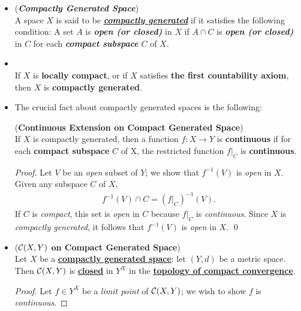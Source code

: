 \documentclass[11pt]{article}
\begin{document}
\begin{itemize}
\item \begin{definition} (\emph{\textbf{Compactly Generated Space}})\\
A space $X$ is said to be \underline{\emph{\textbf{compactly generated}}} if it satisfies the following condition: A set $A$ is \emph{\textbf{open (or closed)}} in $X$ if $A \cap C$ is \emph{\textbf{open (or closed)}} in $C$ for each \textbf{\emph{compact subspace}} $C$ of $X$.
\end{definition}

\item \begin{lemma} \citep{munkres2000topology}\\
If $X$ is \textbf{locally compact}, or if $X$ satisfies \textbf{the first countability axiom}, then $X$ is \textbf{compactly generated}.
\end{lemma}

\item The crucial fact about compactly generated spaces is the following:
\begin{lemma} (\textbf{Continuous Extension on Compact Generated Space})  \citep{munkres2000topology}\\
If $X$ is compactly generated, then a function $f : X \rightarrow Y$ is \textbf{continuous} if for each \textbf{compact subspace} $C$ of X, the restricted function $f |_{C}$ is \textbf{continuous}.
\end{lemma}
\begin{proof}
Let $V$ be an \emph{open} subset of $Y$; we show that $f^{-1}(V)$ is \emph{open} in $X$. Given any subspace $C$ of $X$,
\begin{align*}
f^{-1}(V) \cap C = (f|_C)^{-1}(V).
\end{align*}
If $C$ is \emph{compact}, this set is \emph{open} in $C$ because $f|_C$ is \emph{continuous}. Since $X$ is \emph{compactly generated}, it follows that $f^{-1}(V)$ is \emph{open} in $X$. \qed
\end{proof}

\item \begin{theorem} (\textbf{${\mathcal C}(X, Y)$ on Compact Generated Space})  \citep{munkres2000topology}\\
Let $X$ be a \underline{\textbf{compactly generated space}}: let $(Y, d)$ be a metric space. Then ${\mathcal C}(X, Y)$ is \underline{\textbf{closed}} in $Y^X$ in the \underline{\textbf{topology of compact convergence}}.
\end{theorem}
\begin{proof}
Let $f \in Y^X$ be a \emph{limit point} of ${\mathcal C}(X, Y)$; we wish to show $f$ is \emph{continuous}.


\end{proof}
\end{itemize}
\end{document}
